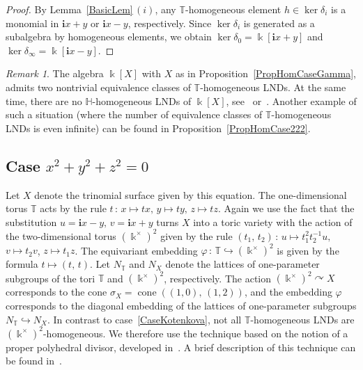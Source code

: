 \documentclass[a4paper,reqno,12pt]{amsart}
\theoremstyle{plain}
\theoremstyle{definition}
\theoremstyle{plain}
\theoremstyle{remark}
\newtheorem{remark}[theorem]{Remark}
\newcommand{\TT}{\mathbb{T}}
\DeclareMathOperator{\cone}{cone}
\newcommand{\lmt}{\longmapsto}
\newcommand{\kk}{\Bbbk}
\newcommand{\HH}{\mathbb H}
\newcommand{\ii}{\mathbf{i}}
\begin{document}
\begin{proof}
     By Lemma~\ref{BasicLem}\,$(i)$, any ${\TT}$-homogeneous element $h\in\ker\delta_i$ is a monomial in $\ii x+y$ or $\ii x-y$, respectively. Since $\ker\delta_i$ is generated as a subalgebra by homogeneous elements, we obtain $\ker\delta_0=\Bbbk[\ii x+y]$ and $\ker\delta_\infty=\Bbbk[\ii x-y]$.
\end{proof}

\begin{remark}\label{RemarkCompareT&H}
    The algebra $\kk[X]$ with $X$ as in Proposition~\ref{PropHomCaseGamma}, admits two nontrivial equivalence classes of ${\TT}$-homogeneous LNDs. At the same time, there are no $\HH$-homogeneous LNDs of $\kk[X]$, see~\cite[Corollary~1]{R} or~\cite[Theorem~1]{GZ}. Another example of such a situation (where the number of equivalence classes of ${\TT}$-homogeneous LNDs is even infinite) can be found in Proposition~\ref{PropHomCase222}.

\end{remark}


\subsection{Case $x^2+y^2+z^2=0$}\label{PropHomCaseDivisor}
Let $X$ denote the trinomial surface given by this equation.
The one-dimensional torus ${\TT}$ acts by the rule $t\,\colon\, x\longmapsto tx,\,y\lmt ty,\,z\lmt tz$. Again we use the fact that the substitution $u=\ii x-y,\,v=\ii x+y$ turns $X$ into a toric variety with the action of the two-dimensional torus $(\Bbbk^\times)^2$ given by the rule $(t_1,\,t_2)\,\colon\,u\lmt t_1^2t_2^{-1}u,$ $v\lmt t_2v$, $z\lmt t_1z$. The equivariant embedding $\varphi\,\colon\,{\TT}\hookrightarrow(\Bbbk^\times)^2$ is given by the formula $t\lmt(t,\,t)$. Let $N_{\TT}$ and $N_X$ denote the lattices of one-parameter subgroups of the tori ${\TT}$ and $(\Bbbk^\times)^2$, respectively. The action $(\Bbbk^\times)^2\curvearrowright X$ corresponds to the cone $\sigma_X=\cone((1,0),\,(1,2))$, and the embedding $\varphi$ corresponds to the diagonal embedding of the lattices of one-parameter subgroups $N_{{\TT}}\hookrightarrow N_X$. In contrast to case~\ref{CaseKotenkova}, not all ${\TT}$-homogeneous LNDs are $(\Bbbk^\times)^2$-homogeneous. We therefore use the technique based on the notion of a proper polyhedral divisor, developed in~\cite{Altmann-Hausen, Liendo}. A brief description of this technique can be found in~\cite[Section~1]{AL}.
\end{document}
